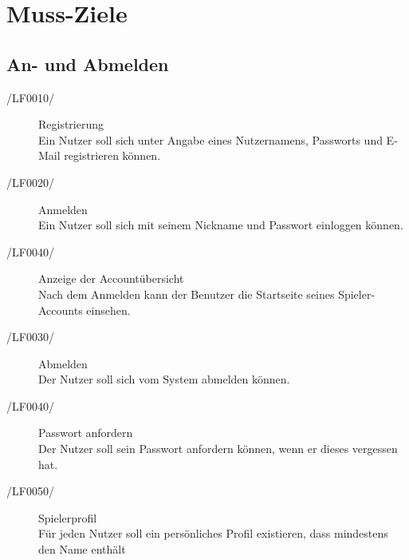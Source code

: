 \documentclass[11pt,a4paper]{scrreprt}
\begin{document}
\section{Muss-Ziele}
\subsection{An- und Abmelden}
\begin{description}
\item[/LF0010/] Registrierung \\
Ein Nutzer soll sich unter Angabe eines Nutzernamens, Passworts und E-Mail registrieren können.

\item[/LF0020/] Anmelden \\
Ein Nutzer soll sich mit seinem Nickname und Passwort einloggen können.

\item[/LF0040/] Anzeige der Accountübersicht \\
Nach dem Anmelden kann der Benutzer die Startseite seines Spieler-Accounts einsehen. %

\item[/LF0030/] Abmelden \\
Der Nutzer soll sich vom System abmelden können.

\item[/LF0040/] Passwort anfordern \\
Der Nutzer soll sein Passwort anfordern können, wenn er dieses vergessen hat.

\item[/LF0050/] Spielerprofil \\
Für jeden Nutzer soll ein persönliches Profil existieren, dass mindestens den Name enthält
\end{description}

\end{document}
